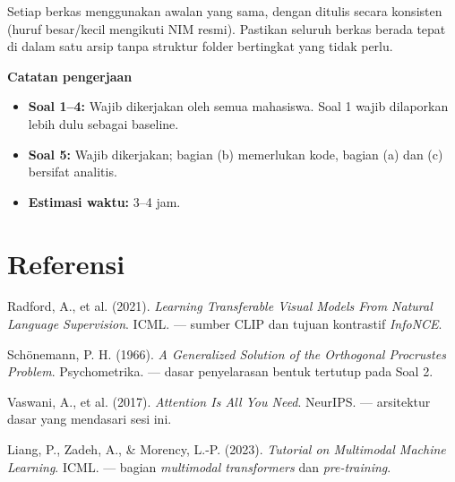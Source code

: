 \documentclass[12pt, a4paper]{article}
\begin{document}
Setiap berkas menggunakan awalan  yang sama, dengan  ditulis secara konsisten (huruf besar/kecil mengikuti NIM resmi). Pastikan seluruh berkas berada tepat di dalam satu arsip  tanpa struktur folder bertingkat yang tidak perlu.

\begin{callout}[ctpBlue]
\textbf{\color{ctpBlue}Catatan pengerjaan}
\begin{itemize}
  \item \textbf{Soal 1--4:} Wajib dikerjakan oleh semua mahasiswa. Soal 1 wajib dilaporkan lebih dulu sebagai baseline.
  \item \textbf{Soal 5:} Wajib dikerjakan; bagian (b) memerlukan kode, bagian (a) dan (c) bersifat analitis.
  \item \textbf{Estimasi waktu:} 3--4 jam.
\end{itemize}
\end{callout}

\section*{Referensi}
{\small\color{ctpSubtext}
\begin{enumerate}[label={[\arabic*]}, leftmargin=2em]
  \item Radford, A., et al. (2021). \emph{Learning Transferable Visual Models From Natural Language Supervision}. ICML. --- sumber CLIP dan tujuan kontrastif \emph{InfoNCE}.
  \item Sch\"onemann, P. H. (1966). \emph{A Generalized Solution of the Orthogonal Procrustes Problem}. Psychometrika. --- dasar penyelarasan bentuk tertutup pada Soal 2.
  \item Vaswani, A., et al. (2017). \emph{Attention Is All You Need}. NeurIPS. --- arsitektur dasar yang mendasari sesi ini.
  \item Liang, P., Zadeh, A., \& Morency, L.-P. (2023). \emph{Tutorial on Multimodal Machine Learning}. ICML. --- bagian \emph{multimodal transformers} dan \emph{pre-training}.
\end{enumerate}}
\end{document}
